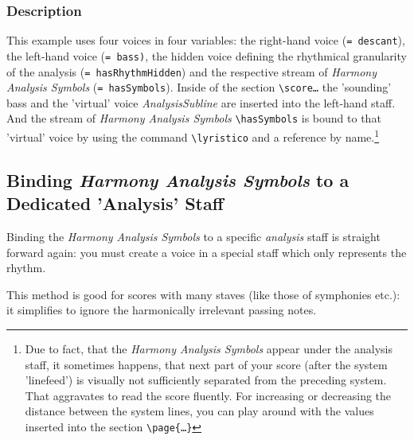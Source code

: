 \documentclass[
  DIV=calc,
  BCOR=5mm,
  12pt,
  headings=small,
  oneside,
  abstract=true,
  toc=bib,
  xcolor=dvipsnames,
  openany,
  ngerman,english]{scrartcl}
\newcommand{\acc}[0]{\textit}
\newcommand{\has}[1]{\textit{Harmony Analysis Symbol#1}}
\begin{document}
\subsubsection{Description}

This example uses four voices in four variables: the right-hand voice
(\texttt{= descant}), the left-hand voice (\texttt{= bass)}, the hidden voice
defining the rhythmical granularity of the analysis (\texttt{= hasRhythmHidden})
and the respective stream of \has{s} (\texttt{= hasSymbols}). Inside of the
section \texttt{\textbackslash score{\ldots}} the 'sounding' bass and the
'virtual' voice \acc{AnalysisSubline} are inserted into the left-hand staff. And
the stream of \has{s} \texttt{\textbackslash hasSymbols} is bound to that
'virtual' voice by using the command \texttt{\textbackslash lyristico} and a
reference by name.\footnote{Due to fact, that the \has{s} appear under the
analysis staff, it sometimes happens, that next part of your score (after the
system 'linefeed') is visually not sufficiently separated from the preceding
system. That aggravates to read the score fluently. For increasing or decreasing
the distance between the system lines, you can play around with the values
inserted into the section \texttt{\textbackslash page\{\ldots\}}}


\subsection{Binding \has{s} to a Dedicated 'Analysis' Staff}
\label{BindingToDedicatedAnalysisStaff}

Binding the \has{s} to a specific \acc{analysis} staff is straight forward
again: you must create a voice in a special staff which only represents the
rhythm. 

This method is good for scores with many staves (like those of symphonies etc.):
it simplifies to ignore the harmonically irrelevant passing notes.
\end{document}
